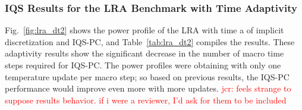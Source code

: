 \documentclass{elsarticle}
\newcommand{\fig}[1]{Fig.~\ref{#1}}                      %
\newcommand{\tbl}[1]{Table~\ref{#1}}                     %
\newcommand{\iqspc}{IQS-PC\xspace}
\newcommand{\jcr}[1]{\textcolor{red}{jcr: #1}}
\begin{document}
\subsubsection{IQS Results for the LRA Benchmark with Time Adaptivity}

\fig{fig:lra_dt2} shows the power profile of the LRA with time a of implicit discretization and \iqspc, and \tbl{tab:lra_dt2} compiles the results. These adaptivity results show the significant decrease in the number of macro time steps required for \iqspc. The power profiles were obtaining with only one temperature update per macro step; so based on previous results, the \iqspc performance would improve even more with more updates. \jcr{feels strange to suppose results behavior. if i were a reviewer, I'd ask for them to be included}
\end{document}
